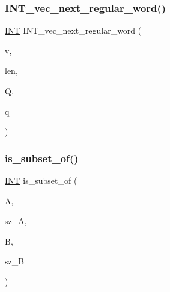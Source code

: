 \mbox{\label{combinatorics_8_c_a6340daf87c2e416693d3dd07f290ab5b}} 
\subsubsection{\texorpdfstring{I\+N\+T\+\_\+vec\+\_\+next\+\_\+regular\+\_\+word()}{INT\_vec\_next\_regular\_word()}}
{\footnotesize\ttfamily \mbox{\hyperlink{galois_8h_a09fddde158a3a20bd2dcadb609de11dc}{I\+NT}} I\+N\+T\+\_\+vec\+\_\+next\+\_\+regular\+\_\+word (\begin{DoxyParamCaption}\item[{\mbox{\hyperlink{galois_8h_a09fddde158a3a20bd2dcadb609de11dc}{I\+NT}} $\ast$}]{v,  }\item[{\mbox{\hyperlink{galois_8h_a09fddde158a3a20bd2dcadb609de11dc}{I\+NT}}}]{len,  }\item[{\mbox{\hyperlink{galois_8h_a09fddde158a3a20bd2dcadb609de11dc}{I\+NT}}}]{Q,  }\item[{\mbox{\hyperlink{galois_8h_a09fddde158a3a20bd2dcadb609de11dc}{I\+NT}}}]{q }\end{DoxyParamCaption})}

\mbox{\label{combinatorics_8_c_a347afaeb52b142b1fd696c20e75dde33}} 
\subsubsection{\texorpdfstring{is\+\_\+subset\+\_\+of()}{is\_subset\_of()}}
{\footnotesize\ttfamily \mbox{\hyperlink{galois_8h_a09fddde158a3a20bd2dcadb609de11dc}{I\+NT}} is\+\_\+subset\+\_\+of (\begin{DoxyParamCaption}\item[{\mbox{\hyperlink{galois_8h_a09fddde158a3a20bd2dcadb609de11dc}{I\+NT}} $\ast$}]{A,  }\item[{\mbox{\hyperlink{galois_8h_a09fddde158a3a20bd2dcadb609de11dc}{I\+NT}}}]{sz\+\_\+A,  }\item[{\mbox{\hyperlink{galois_8h_a09fddde158a3a20bd2dcadb609de11dc}{I\+NT}} $\ast$}]{B,  }\item[{\mbox{\hyperlink{galois_8h_a09fddde158a3a20bd2dcadb609de11dc}{I\+NT}}}]{sz\+\_\+B }\end{DoxyParamCaption})}

